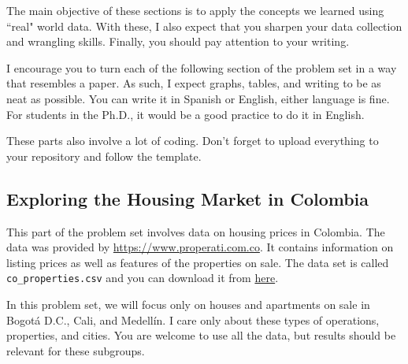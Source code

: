 \documentclass[12pt,onecolumn]{article}
\begin{document}
The main objective of these sections is to apply the concepts we learned using ``real" world data. With these, I also expect that you sharpen your data collection and wrangling skills. Finally, you should pay attention to your writing.

I encourage you to turn each of the following section of the problem set in a way that resembles a paper. As such, I expect graphs, tables, and writing to be as neat as possible. You can write it in Spanish or English, either language is fine. For students in the Ph.D., it would be a good practice to do it in English.

These parts also involve a lot of coding. Don't forget to upload everything to your repository and follow the template. 

\subsection{Exploring the Housing Market in Colombia}

This part of the problem set involves data on housing prices in Colombia. The data was provided by \url{https://www.properati.com.co}. It contains information on listing prices as well as features of the properties on sale. The data set is called \texttt{co\_properties.csv} and you can download it from \href{https://www.dropbox.com/s/7za955mzf7b7qti/co_properties.zip?dl=0}{here}. 


In this problem set, we will focus only on houses and apartments on sale in Bogotá D.C., Cali, and Medellín. I care only about these types of operations, properties, and cities. You are welcome to use all the data, but results should be relevant for these subgroups.
\end{document}

